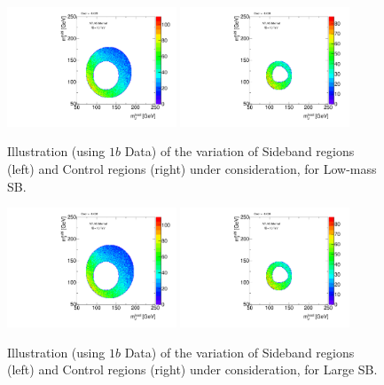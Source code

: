 \begin{figure}[htbp!]
\begin{center}
\includegraphics[width=0.45\textwidth,angle=-90]{figures/boosted/Syst_CRSB/SB_Low_Sideband_OneTag_mH0H1.pdf}
\includegraphics[width=0.45\textwidth,angle=-90]{figures/boosted/Syst_CRSB/SB_Low_Control_OneTag_mH0H1.pdf}\\
\end{center}
\caption{Illustration (using $1b$ Data) of the variation of Sideband regions (left) and Control regions (right) under consideration, for Low-mass SB.}
\label{CRSB:SB_Low}
\end{figure}

\begin{figure}[htbp!]
\begin{center}
\includegraphics[width=0.45\textwidth,angle=-90]{figures/boosted/Syst_CRSB/SB_Large_Sideband_OneTag_mH0H1.pdf}
\includegraphics[width=0.45\textwidth,angle=-90]{figures/boosted/Syst_CRSB/SB_Large_Control_OneTag_mH0H1.pdf}\\
\end{center}
\caption{Illustration (using $1b$ Data) of the variation of Sideband regions (left) and Control regions (right) under consideration, for Large SB.}
\label{CRSB:SB_Large}
\end{figure}

